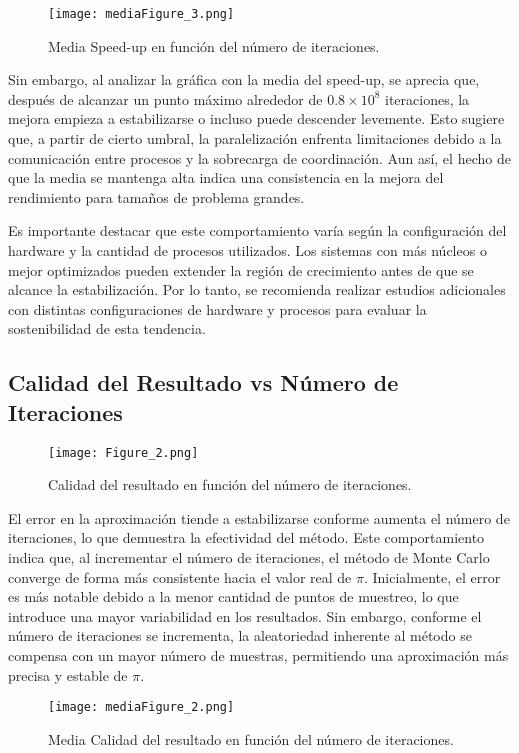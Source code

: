 \documentclass[conference, a4paper]{IEEEtran}
\begin{document}
\begin{figure}[h!]
    \centering
    \texttt{[image: mediaFigure\_3.png]}
    \caption{Media Speed-up en función del número de iteraciones.}
    \label{fig:speedup}
\end{figure}

Sin embargo, al analizar la gráfica con la media del speed-up, se aprecia que, después de alcanzar un punto máximo alrededor de \(0.8 \times 10^8\) iteraciones, la mejora empieza a estabilizarse o incluso puede descender levemente. Esto sugiere que, a partir de cierto umbral, la paralelización enfrenta limitaciones debido a la comunicación entre procesos y la sobrecarga de coordinación. Aun así, el hecho de que la media se mantenga alta indica una consistencia en la mejora del rendimiento para tamaños de problema grandes.

Es importante destacar que este comportamiento varía según la configuración del hardware y la cantidad de procesos utilizados. Los sistemas con más núcleos o mejor optimizados pueden extender la región de crecimiento antes de que se alcance la estabilización. Por lo tanto, se recomienda realizar estudios adicionales con distintas configuraciones de hardware y procesos para evaluar la sostenibilidad de esta tendencia.


\subsection{Calidad del Resultado vs Número de Iteraciones}
\begin{figure}[h!]
    \centering
    \texttt{[image: Figure\_2.png]}
    \caption{Calidad del resultado en función del número de iteraciones.}
    \label{fig:calidad}
\end{figure}

El error en la aproximación tiende a estabilizarse conforme aumenta el número de iteraciones, lo que demuestra la efectividad del método. Este comportamiento indica que, al incrementar el número de iteraciones, el método de Monte Carlo converge de forma más consistente hacia el valor real de \(\pi\). Inicialmente, el error es más notable debido a la menor cantidad de puntos de muestreo, lo que introduce una mayor variabilidad en los resultados. Sin embargo, conforme el número de iteraciones se incrementa, la aleatoriedad inherente al método se compensa con un mayor número de muestras, permitiendo una aproximación más precisa y estable de \(\pi\).

\begin{figure}[h!]
    \centering
    \texttt{[image: mediaFigure\_2.png]}
    \caption{Media Calidad del resultado en función del número de iteraciones.}
    \label{fig:calidad}
\end{figure}
\end{document}
